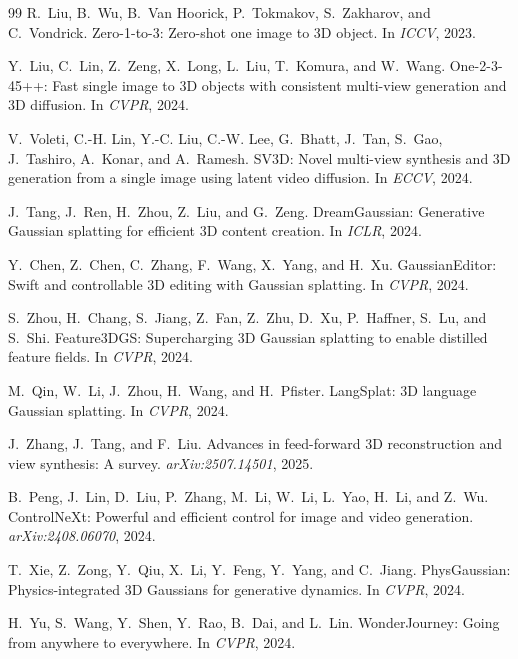 \begin{thebibliography}{99}
R.~Liu, B.~Wu, B.~Van Hoorick, P.~Tokmakov, S.~Zakharov, and C.~Vondrick.
Zero-1-to-3: Zero-shot one image to 3{D} object.
In \emph{ICCV}, 2023.

Y.~Liu, C.~Lin, Z.~Zeng, X.~Long, L.~Liu, T.~Komura, and W.~Wang.
One-2-3-45++: Fast single image to 3{D} objects with consistent multi-view generation and 3{D} diffusion.
In \emph{CVPR}, 2024.

V.~Voleti, C.-H. Lin, Y.-C. Liu, C.-W. Lee, G.~Bhatt, J.~Tan, S.~Gao, J.~Tashiro, A.~Konar, and A.~Ramesh.
{SV3D}: Novel multi-view synthesis and 3{D} generation from a single image using latent video diffusion.
In \emph{ECCV}, 2024.

J.~Tang, J.~Ren, H.~Zhou, Z.~Liu, and G.~Zeng.
{DreamGaussian}: Generative Gaussian splatting for efficient 3{D} content creation.
In \emph{ICLR}, 2024.

Y.~Chen, Z.~Chen, C.~Zhang, F.~Wang, X.~Yang, and H.~Xu.
{GaussianEditor}: Swift and controllable 3{D} editing with Gaussian splatting.
In \emph{CVPR}, 2024.

S.~Zhou, H.~Chang, S.~Jiang, Z.~Fan, Z.~Zhu, D.~Xu, P.~Haffner, S.~Lu, and S.~Shi.
{Feature3DGS}: Supercharging 3{D} Gaussian splatting to enable distilled feature fields.
In \emph{CVPR}, 2024.

M.~Qin, W.~Li, J.~Zhou, H.~Wang, and H.~Pfister.
{LangSplat}: 3{D} language Gaussian splatting.
In \emph{CVPR}, 2024.

J.~Zhang, J.~Tang, and F.~Liu.
Advances in feed-forward 3{D} reconstruction and view synthesis: A survey.
\emph{arXiv:2507.14501}, 2025.

B.~Peng, J.~Lin, D.~Liu, P.~Zhang, M.~Li, W.~Li, L.~Yao, H.~Li, and Z.~Wu.
{ControlNeXt}: Powerful and efficient control for image and video generation.
\emph{arXiv:2408.06070}, 2024.

T.~Xie, Z.~Zong, Y.~Qiu, X.~Li, Y.~Feng, Y.~Yang, and C.~Jiang.
{PhysGaussian}: Physics-integrated 3{D} Gaussians for generative dynamics.
In \emph{CVPR}, 2024.

H.~Yu, S.~Wang, Y.~Shen, Y.~Rao, B.~Dai, and L.~Lin.
{WonderJourney}: Going from anywhere to everywhere.
In \emph{CVPR}, 2024.


\end{thebibliography}
